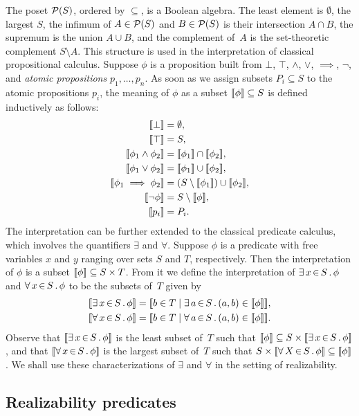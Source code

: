 The poset $\mathcal{P}(S)$, ordered by $\subseteq$, is a Boolean algebra. The
least element is $\emptyset$, the largest $S$, the infimum of $A \in
\mathcal{P}(S)$ and $B \in \mathcal{P}(S)$ is their intersection $A \cap B$, the
supremum is the union $A \cup B$, and the complement of~$A$ is the
set-theoretic complement $S \setminus A$. This structure is used in
the interpretation of classical propositional calculus. Suppose $\phi$
is a proposition built from $\bot$, $\top$, $\land$, $\lor$,
$\implies$, $\lnot$, and \emph{atomic propositions} $p_1, \ldots,
p_n$. As soon as we assign subsets $P_i \subseteq S$ to the atomic
propositions $p_i$, the meaning of $\phi$ as a subset $[\![\phi]\!]
\subseteq S$ is defined inductively as follows:
%
\begin{align*}
  \sem{\bot} &= \emptyset,\\
  \sem{\top} &= S,\\
  \sem{\phi_1 \land \phi_2} &= \sem{\phi_1} \cap \sem{\phi_2},\\
  \sem{\phi_1 \lor \phi_2} &= \sem{\phi_1} \cup \sem{\phi_2},\\
  \sem{\phi_1 \implies \phi_2} &= (S \setminus \sem{\phi_1}) \cup \sem{\phi_2},\\
  \sem{\lnot \phi} &= S \setminus \sem{\phi},\\
  \sem{p_i} &= P_i.
\end{align*}
%
The interpretation can be further extended to the classical predicate
calculus, which involves the quantifiers $\exists$ and $\forall$.
Suppose $\phi$ is a predicate with free variables $x$ and $y$ ranging
over sets $S$ and $T$, respectively. Then the interpretation of $\phi$
is a subset $[\![\phi]\!] \subseteq S \times T$. From it we define the
interpretation of $\exists\, x \,{\in}\, S\,.\,\phi$ and $\forall\, x \,{\in}\, S\,.\,\phi$ to be
the subsets of~$T$ given by
%
\begin{align*}
  \sem{\xsome{x}{S}{\phi}} &=
  \sem{b \in T \such \xsome{a}{S}{(a,b) \in \sem{\phi}}}, \\
  \sem{\xall{x}{S}{\phi}} &=
  \sem{b \in T \such \xall{a}{S}{(a,b) \in \sem{\phi}}}.
\end{align*}
%
Observe that $[\![\exists\, x \,{\in}\, S\,.\,\phi]\!]$ is the least subset of~$T$
such that $[\![\phi]\!] \subseteq S \times [\![\exists\, x \,{\in}\, S\,.\,\phi]\!]$,
and that $[\![\forall\, x \,{\in}\, S\,.\,\phi]\!]$ is the largest subset of~$T$ such
that $S \times [\![\forall\, X \,{\in}\, S\,.\,\phi]\!] \subseteq [\![\phi]\!]$. We shall
use these characterizations of $\exists$ and $\forall$ in the setting
of realizability.

\subsection{Realizability predicates}
\label{sec:realizability-predicates}


